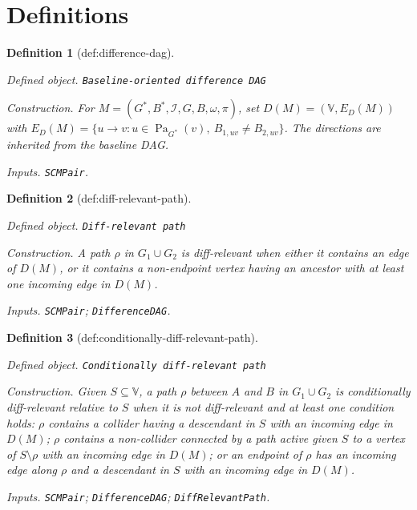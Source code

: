 \documentclass{article}
\newtheorem{definition}{Definition}
\begin{document}
\section{Definitions}

\begin{definition}[def:difference-dag]\label{def:difference-dag}
\par\smallskip\noindent\emph{Defined object.} \texttt{Baseline-\allowbreak{}oriented difference DAG}
\par\smallskip\noindent\emph{Construction.} For \(M=(G^*,B^*,\mathcal I,G,B,\omega,\pi)\), set \(D(M)=(\mathbb V,E_D(M))\) with \(E_D(M)=\{u\to v:u\in\operatorname{Pa}_{G^*}(v),\ B_{1,uv}\neq B_{2,uv}\}\). The directions are inherited from the baseline DAG.
\par\smallskip\noindent\emph{Inputs.} \texttt{SCMPair}.
\end{definition}

\begin{definition}[def:diff-relevant-path]\label{def:diff-relevant-path}
\par\smallskip\noindent\emph{Defined object.} \texttt{Diff-\allowbreak{}relevant path}
\par\smallskip\noindent\emph{Construction.} A path \(\rho\) in \(G_1\cup G_2\) is diff-relevant when either it contains an edge of \(D(M)\), or it contains a non-endpoint vertex having an ancestor with at least one incoming edge in \(D(M)\).
\par\smallskip\noindent\emph{Inputs.} \texttt{SCMPair}; \texttt{DifferenceDAG}.
\end{definition}

\begin{definition}[def:conditionally-diff-relevant-path]\label{def:conditionally-diff-relevant-path}
\par\smallskip\noindent\emph{Defined object.} \texttt{Conditionally diff-\allowbreak{}relevant path}
\par\smallskip\noindent\emph{Construction.} Given \(S\subseteq\mathbb V\), a path \(\rho\) between \(A\) and \(B\) in \(G_1\cup G_2\) is conditionally diff-relevant relative to \(S\) when it is not diff-relevant and at least one condition holds: \(\rho\) contains a collider having a descendant in \(S\) with an incoming edge in \(D(M)\); \(\rho\) contains a non-collider connected by a path active given \(S\) to a vertex of \(S\setminus\rho\) with an incoming edge in \(D(M)\); or an endpoint of \(\rho\) has an incoming edge along \(\rho\) and a descendant in \(S\) with an incoming edge in \(D(M)\).
\par\smallskip\noindent\emph{Inputs.} \texttt{SCMPair}; \texttt{DifferenceDAG}; \texttt{DiffRelevantPath}.
\end{definition}
\end{document}
